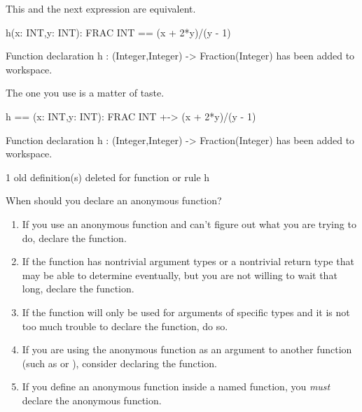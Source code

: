 \begin{xtc}
\begin{xtccomment}
This and the next expression are equivalent.
\end{xtccomment}
\begin{spadsrc}
h(x: INT,y: INT): FRAC INT == (x + 2*y)/(y - 1)
\end{spadsrc}
\begin{MessageOutput}
   Function declaration h : (Integer,Integer) -> Fraction(Integer) has 
      been added to workspace.
\end{MessageOutput}
\end{xtc}
\begin{xtc}
\begin{xtccomment}
The one you use is a matter of taste.
\end{xtccomment}
\begin{spadsrc}
h == (x: INT,y: INT): FRAC INT +-> (x + 2*y)/(y - 1)
\end{spadsrc}
\begin{MessageOutput}
   Function declaration h : (Integer,Integer) -> Fraction(Integer) has 
      been added to workspace.
\end{MessageOutput}
\begin{MessageOutput}
   1 old definition(s) deleted for function or rule h 
\end{MessageOutput}
\end{xtc}

When should you declare an anonymous function?
\begin{enumerate}
\item If you use an anonymous function and \Language{} can't figure
out what you are trying to do, declare the function.
\item If the function has nontrivial argument types or a
nontrivial return type that
\Language{} may be able to determine eventually, but you are not
willing to wait that long, declare the function.
\item If the function will only be used for arguments of specific
types and it is not too much trouble to declare the function, do so.
\item If you are using the anonymous function as an argument to
another function (such as  or ),
consider declaring the function.
\item If you define an anonymous function inside a named function,
you {\it must} declare the anonymous function.
\end{enumerate}

